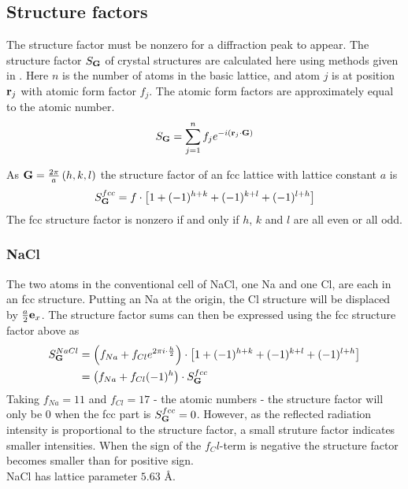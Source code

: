 \documentclass[a4paper,twoside=false,abstract=false,numbers=noenddot,
titlepage=false,headings=small,parskip=half,version=last]{scrartcl}
\begin{document}
\subsection{Structure factors}
The structure factor must be nonzero for a diffraction peak to appear.
The structure factor $S_{\bold{G}}$ of crystal structures are calculated here using methods given in \cite{Kittel}. Here $n$ is the number of atoms in the basic lattice, and atom $j$ is at position $\bold{r}_j$ with atomic form factor $f_j$. The atomic form factors are approximately equal to the atomic number.\\
\begin{equation}
    S_{\bold{G}} = \sum^n_{j=1} f_j e^{-i \left( \bold{r}_j \cdot \bold{G}\right)}\nonumber
\end{equation}

As $\bold{G} = \frac{2\pi}{a}\left( h,k,l \right)$ the structure factor of an fcc lattice with lattice constant $a$ is
\begin{equation}
    S^{fcc}_{\bold{G}} = f\cdot \left[ 1 + (-1)^{h+k} + (-1)^{k+l} + (-1)^{l+h}\right]\nonumber
\end{equation}
The fcc structure factor is nonzero if and only if $h$, $k$ and $l$ are all even or all odd.\\

\subsubsection{NaCl}
The two atoms in the conventional cell of NaCl, one Na and one Cl, are each in an fcc structure.
Putting an Na at the origin, the Cl structure will be displaced by $\frac{a}{2}\bold{e}_x$.
The structure factor sums can then be expressed using the fcc structure factor above as
\begin{align}
    S^{NaCl}_{\bold{G}}
    &= \left( f_{Na} + f_{Cl}e^{2\pi i\cdot \frac{h}{2}} \right) \cdot \left[ 1 + (-1)^{h+k} + (-1)^{k+l} + (-1)^{l+h}\right]\nonumber\\
    &= \left( f_{Na} + f_{Cl}(-1)^{h} \right) \cdot S^{fcc}_{\bold{G}}\nonumber
\end{align}
Taking $f_{Na}=11$ and $f_{Cl}=17$ - the atomic numbers - the structure factor will only be $0$ when the fcc part is $S^{fcc}_{\bold{G}}=0$.
However, as the reflected radiation intensity is proportional to the structure factor, a small struture factor indicates smaller intensities.
When the sign of the $f_Cl$-term is negative the structure factor becomes smaller than for positive sign.\\
NaCl has lattice parameter $5.63$ Å.
\end{document}
